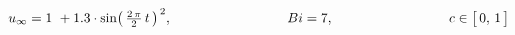 $u _{\infty}  = 1\ + 1.3\cdot\sin\bigl(\,\frac{2\,\pi}{2}\,t\,\bigr)^{\,2}, \hspace{30mm} Bi=7, \hspace{30mm} c \in \big[ \, 0, \, 1 \, \big]$
